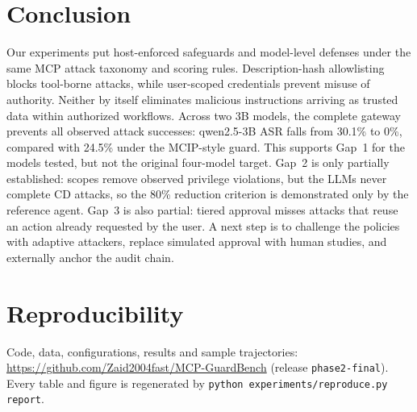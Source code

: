\documentclass[conference]{IEEEtran}
\begin{document}
\section{Conclusion}

Our experiments put host-enforced safeguards and model-level defenses under the same MCP
attack taxonomy and scoring rules. Description-hash allowlisting blocks
tool-borne attacks, while user-scoped credentials prevent misuse of authority. Neither by itself
eliminates malicious instructions arriving as trusted data within authorized workflows. Across
two 3B models, the complete gateway prevents all observed attack successes: qwen2.5-3B ASR
falls from 30.1\% to 0\%, compared with 24.5\% under the MCIP-style guard. This supports Gap~1
for the models tested, but not the original four-model target. Gap~2 is only partially established:
scopes remove observed privilege violations, but the LLMs never complete CD attacks, so the
80\% reduction criterion is demonstrated only by the reference agent. Gap~3 is also partial:
tiered approval misses attacks that reuse an action already requested by the user. A next step is to challenge the policies with adaptive attackers, replace simulated approval
with human studies, and externally anchor the audit chain.

\section*{Reproducibility}
Code, data, configurations, results and sample trajectories:
\url{https://github.com/Zaid2004fast/MCP-GuardBench} (release \texttt{phase2-final}). Every table and
figure is regenerated by \texttt{python experiments/reproduce.py report}.



\end{document}
